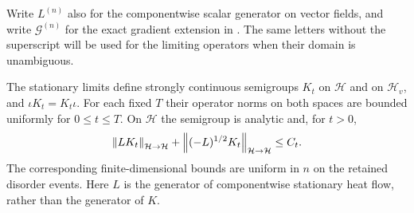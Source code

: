 Write $L^{(n)}$ also for the componentwise scalar generator on vector
fields, and write $\mathcal G^{(n)}$ for the exact gradient extension in
.  The same letters without the superscript will
be used for the limiting operators when their domain is unambiguous.

\begin{lemma}\label{lem:exact-smoothing}
The stationary limits define strongly continuous semigroups $K_t$ on
$\mathcal H$ and on $\mathcal H_v$, and
$\iota K_t=K_t\iota$.  For each fixed $T$ their operator norms on both
spaces are bounded uniformly for $0\le t\le T$.  On $\mathcal H$ the
semigroup is analytic and, for $t>0$,
\begin{equation}\label{eq:exact-graph}
 \left\lVert L K_t\right\rVert_{\mathcal H\to\mathcal H}
 +\left\lVert (-L)^{1/2}K_t\right\rVert_{\mathcal H\to\mathcal H}
 \le C_t.
\end{equation}
The corresponding finite-dimensional bounds are uniform in $n$ on the
retained disorder events.  Here $L$ is the generator of componentwise
stationary heat flow, rather than the generator of $K$.
\end{lemma}

